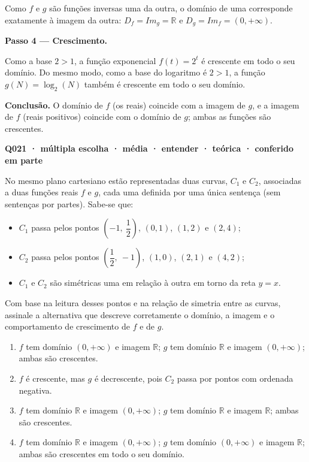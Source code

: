 \documentclass[11pt,a4paper]{article}
\begin{document}
Como $f$ e $g$ são funções inversas uma da outra, o domínio de uma corresponde exatamente à imagem da outra: $D_f = Im_g = \mathbb{R}$ e $D_g = Im_f = (0, +\infty)$.

\textbf{Passo 4 — Crescimento.}

Como a base $2 > 1$, a função exponencial $f(t) = 2^t$ é crescente em todo o seu domínio. Do mesmo modo, como a base do logaritmo é $2 > 1$, a função $g(N) = \log_2(N)$ também é crescente em todo o seu domínio.

\textbf{Conclusão.} O domínio de $f$ (os reais) coincide com a imagem de $g$, e a imagem de $f$ (reais positivos) coincide com o domínio de $g$; ambas as funções são crescentes.

\bigskip\noindent\textbf{Q021 · múltipla escolha · média · entender · teórica · conferido em parte}\par\nopagebreak
No mesmo plano cartesiano estão representadas duas curvas, $C_1$ e $C_2$, associadas a duas funções reais $f$ e $g$, cada uma definida por uma única sentença (sem sentenças por partes). Sabe-se que:

\begin{itemize}[nosep,leftmargin=*]
\item $C_1$ passa pelos pontos $\left(-1,\ \dfrac{1}{2}\right)$, $(0,1)$, $(1,2)$ e $(2,4)$;
\item $C_2$ passa pelos pontos $\left(\dfrac{1}{2},\ -1\right)$, $(1,0)$, $(2,1)$ e $(4,2)$;
\item $C_1$ e $C_2$ são simétricas uma em relação à outra em torno da reta $y=x$.
\end{itemize}

Com base na leitura desses pontos e na relação de simetria entre as curvas, assinale a alternativa que descreve corretamente o domínio, a imagem e o comportamento de crescimento de $f$ e de $g$.
\begin{enumerate}[label=(\alph*)]
\item $f$ tem domínio $(0,+\infty)$ e imagem $\mathbb{R}$; $g$ tem domínio $\mathbb{R}$ e imagem $(0,+\infty)$; ambas são crescentes.
\item $f$ é crescente, mas $g$ é decrescente, pois $C_2$ passa por pontos com ordenada negativa.
\item $f$ tem domínio $\mathbb{R}$ e imagem $(0,+\infty)$; $g$ tem domínio $\mathbb{R}$ e imagem $\mathbb{R}$; ambas são crescentes.
\item $f$ tem domínio $\mathbb{R}$ e imagem $(0,+\infty)$; $g$ tem domínio $(0,+\infty)$ e imagem $\mathbb{R}$; ambas são crescentes em todo o seu domínio.
\end{enumerate}
\end{document}
